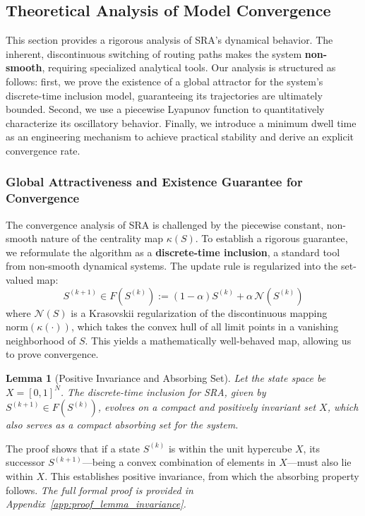 \documentclass[journal]{IEEEtran}
\newtheorem{lemma}{Lemma}
\begin{document}
\subsection{Theoretical Analysis of Model Convergence}
\label{sec:convergence_analysis}

This section provides a rigorous analysis of SRA's dynamical behavior. The inherent, discontinuous switching of routing paths makes the system \textbf{non-smooth}, requiring specialized analytical tools. Our analysis is structured as follows: first, we prove the existence of a global attractor for the system's discrete-time inclusion model, guaranteeing its trajectories are ultimately bounded. Second, we use a piecewise Lyapunov function to quantitatively characterize its oscillatory behavior. Finally, we introduce a minimum dwell time as an engineering mechanism to achieve practical stability and derive an explicit convergence rate.



\subsubsection{Global Attractiveness and Existence Guarantee for Convergence}
\label{subsec:attractivity}

The convergence analysis of SRA is challenged by the piecewise constant, non-smooth nature of the centrality map $\kappa(S)$. To establish a rigorous guarantee, we reformulate the algorithm as a \textbf{discrete-time inclusion}, a standard tool from non-smooth dynamical systems. The update rule is regularized into the set-valued map:
\begin{equation}\label{eq:inclusion_map}
S^{(k+1)} \in F(S^{(k)}) := (1-\alpha)S^{(k)}+\alpha\,\mathcal{N}(S^{(k)})
\end{equation}
where $\mathcal{N}(S)$ is a Krasovskii regularization of the discontinuous mapping $\mathrm{norm}(\kappa(\cdot))$, which takes the convex hull of all limit points in a vanishing neighborhood of $S$. This yields a mathematically well-behaved map, allowing us to prove convergence.

\begin{lemma}[Positive Invariance and Absorbing Set]
\label{lemma:invariance}
Let the state space be $X=[0,1]^N$. The discrete-time inclusion for SRA, given by $S^{(k+1)}\in F(S^{(k)})$, evolves on a compact and positively invariant set $X$, which also serves as a compact absorbing set for the system.
\end{lemma}
\begin{IEEEproof}
The proof shows that if a state $S^{(k)}$ is within the unit hypercube $X$, its successor $S^{(k+1)}$—being a convex combination of elements in $X$—must also lie within $X$. This establishes positive invariance, from which the absorbing property follows. \textit{The full formal proof is provided in Appendix~\ref{app:proof_lemma_invariance}.}
\end{IEEEproof}
\end{document}
